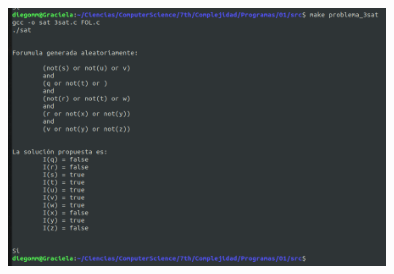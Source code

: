 \documentclass[14pt,letterpaper]{article}
\begin{document}
\begin{itemize}
\begin{enumerate}
    \hfill\break
    
    \begin{figure}[h]
      \includegraphics[width=10cm]{sat_5.png}
      \centering
    \end{figure}

    \hfill\break
    
  \end{enumerate}
\end{itemize}
\end{document}
